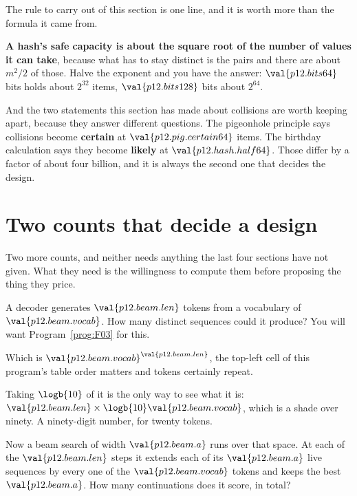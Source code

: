 \begin{fr}
The rule to carry out of this section is one line, and it is worth more than
the formula it came from.

\textbf{A hash's safe capacity is about the square root of the number of
values it can take}, because what has to stay distinct is the pairs and there
are about $m^{2}/2$ of those. Halve the exponent and you have the answer:
$\val{p12.bits64}$ bits holds about $2^{32}$ items, $\val{p12.bits128}$ bits
about $2^{64}$.

And the two statements this section has made about collisions are worth
keeping apart, because they answer different questions. The pigeonhole
principle says collisions become \textbf{certain} at
$\val{p12.pig.certain64}$ items. The birthday calculation says they become
\textbf{likely} at $\val{p12.hash.half64}$. Those differ by a factor of about
four billion, and it is always the second one that decides the design.
\end{fr}

\section{Two counts that decide a design}
\label{sec:P12-designs}

\begin{fr}
Two more counts, and neither needs anything the last four sections have not
given. What they need is the willingness to compute them before proposing the
thing they price.

A decoder generates $\val{p12.beam.len}$ tokens from a vocabulary of
$\val{p12.beam.vocab}$. How many distinct sequences could it produce? You will
want Program~\ref{prog:F03} for this.
\dotline
\nextframe
\end{fr}

\begin{fr}
Which is $\val{p12.beam.vocab}^{\val{p12.beam.len}}$, the top-left cell of
this program's table \dash{} order matters and tokens certainly repeat.

Taking $\logb{10}$ of it is the only way to see what it is:
$\val{p12.beam.len} \times \logb{10}\val{p12.beam.vocab}$, which is a shade
over ninety. A ninety-digit number, for twenty tokens.

Now a beam search of width $\val{p12.beam.a}$ runs over that space. At each of
the $\val{p12.beam.len}$ steps it extends each of its
$\val{p12.beam.a}$ live sequences by every one of the
$\val{p12.beam.vocab}$ tokens and keeps the best $\val{p12.beam.a}$. How many
continuations does it score, in total?
\nextframe
\end{fr}

